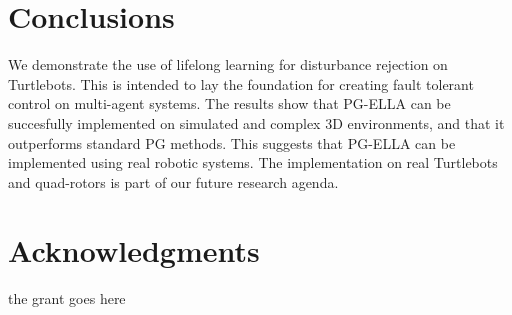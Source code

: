 \documentclass{aamas2016}
\begin{document}
\section{Conclusions}
We demonstrate the use of lifelong learning for disturbance rejection on Turtlebots. This is intended to lay the foundation for creating fault tolerant control on multi-agent systems. The results show that PG-ELLA can be succesfully implemented on simulated and complex 3D environments, and that it outperforms standard PG methods. This suggests that PG-ELLA can be implemented using real robotic systems. The implementation on real Turtlebots and quad-rotors is part of our future research agenda.

\section*{Acknowledgments}
{\color{red} 
the grant goes here
}



%
\end{document}

